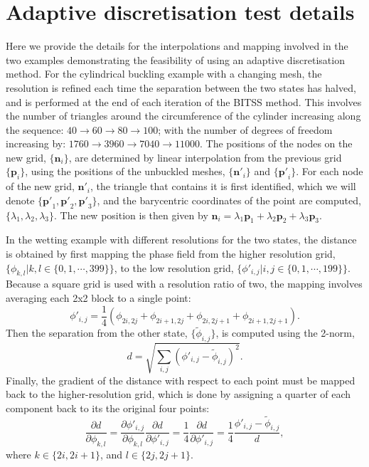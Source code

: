 \documentclass[aip,jcp,reprint,twocolumn]{revtex4-1}
\begin{document}
\section{Adaptive discretisation test details}
Here we provide the details for the interpolations and mapping involved in the two examples demonstrating the feasibility of using an adaptive discretisation method.
For the cylindrical buckling example with a changing mesh, the resolution is refined each time the separation between the two states has halved, and is performed at the end of each iteration of the BITSS method.
This involves the number of triangles around the circumference of the cylinder increasing along the sequence: $40 \rightarrow 60 \rightarrow 80 \rightarrow 100$; with the number of degrees of freedom increasing by: $\num{1760} \rightarrow \num{3960} \rightarrow \num{7040} \rightarrow \num{11000}$.
The positions of the nodes on the new grid, $\{\bm{n}_i\}$, are determined by linear interpolation from the previous grid $\{\bm{p}_i\}$, using the positions of the unbuckled meshes, $\{\bm{n'}_i\}$ and $\{\bm{p'}_i\}$.
For each node of the new grid, $\bm{n'}_i$, the triangle that contains it is first identified, which we will denote $\{\bm{p'}_1,\bm{p'}_2,\bm{p'}_3\}$, and the barycentric coordinates of the point are computed, $\{\lambda_1,\lambda_2,\lambda_3\}$.
The new position is then given by $\bm{n}_i = \lambda_1 \bm{p}_1 + \lambda_2 \bm{p}_2 + \lambda_3 \bm{p}_3$.

In the wetting example with different resolutions for the two states, the distance is obtained by first mapping the phase field from the higher resolution grid, $\{\phi_{k,l} | k,l \in \{0,1,\cdots,399\}\}$, to the low resolution grid, $\{\phi'_{i,j} | i,j \in \{0,1,\cdots,199\}\}$.
Because a square grid is used with a resolution ratio of two, the mapping involves averaging each 2x2 block to a single point:
\begin{equation}
  \phi'_{i,j} = \frac{1}{4} \left( \phi_{2i,2j} + \phi_{2i+1,2j} + \phi_{2i,2j+1} + \phi_{2i+1,2j+1} \right).
\end{equation}
Then the separation from the other state, $\{\widetilde{\phi}_{i,j}\}$, is computed using the 2-norm,
\begin{equation}
  d = \sqrt{\sum_{i,j} \left( \phi'_{i,j} - \widetilde{\phi}_{i,j} \right)^2}.
\end{equation}
Finally, the gradient of the distance with respect to each point must be mapped back to the higher-resolution grid, which is done by assigning a quarter of each component back to its the original four points:
\begin{equation}
  \frac{\partial d}{\partial \phi_{k,l}} =
    \frac{\partial \phi'_{i,j}}{\partial \phi_{k,l}} \frac{\partial d}{\partial \phi'_{i,j}} =
    \frac{1}{4} \frac{\partial d}{\partial \phi'_{i,j}} =
    \frac{1}{4} \frac{\phi'_{i,j} - \widetilde{\phi}_{i,j}}{d},
\end{equation}
where $k \in \{2i, 2i+1\}$, and $l \in \{2j, 2j+1\}$.
\end{document}
